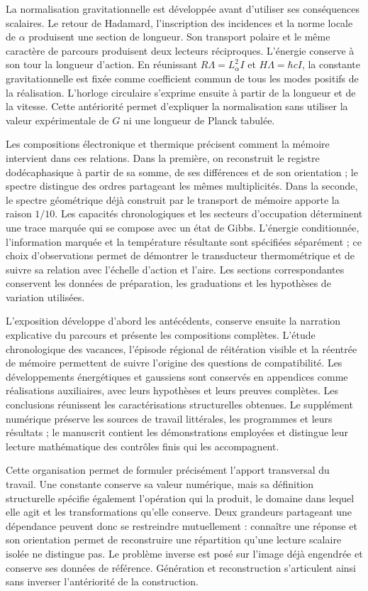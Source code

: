 La normalisation gravitationnelle est développée avant d'utiliser ses conséquences scalaires. Le retour de Hadamard, l'inscription des incidences et la norme locale de $\alpha$ produisent une section de longueur. Son transport polaire et le même caractère de parcours produisent deux lecteurs réciproques. L'énergie conserve à son tour la longueur d'action. En réunissant $R\Lambda=L_\alpha^2I$ et $H\Lambda=\hbar cI$, la constante gravitationnelle est fixée comme coefficient commun de tous les modes positifs de la réalisation. L'horloge circulaire s'exprime ensuite à partir de la longueur et de la vitesse. Cette antériorité permet d'expliquer la normalisation sans utiliser la valeur expérimentale de $G$ ni une longueur de Planck tabulée.

Les compositions électronique et thermique précisent comment la mémoire intervient dans ces relations. Dans la première, on reconstruit le registre dodécaphasique à partir de sa somme, de ses différences et de son orientation ; le spectre distingue des ordres partageant les mêmes multiplicités. Dans la seconde, le spectre géométrique déjà construit par le transport de mémoire apporte la raison $1/10$. Les capacités chronologiques et les secteurs d'occupation déterminent une trace marquée qui se compose avec un état de Gibbs. L'énergie conditionnée, l'information marquée et la température résultante sont spécifiées séparément ; ce choix d'observations permet de démontrer le transducteur thermométrique et de suivre sa relation avec l'échelle d'action et l'aire. Les sections correspondantes conservent les données de préparation, les graduations et les hypothèses de variation utilisées.

L'exposition développe d'abord les antécédents, conserve ensuite la narration explicative du parcours et présente les compositions complètes. L'étude chronologique des vacances, l'épisode régional de réitération visible et la réentrée de mémoire permettent de suivre l'origine des questions de compatibilité. Les développements énergétiques et gaussiens sont conservés en appendices comme réalisations auxiliaires, avec leurs hypothèses et leurs preuves complètes. Les conclusions réunissent les caractérisations structurelles obtenues. Le supplément numérique préserve les sources de travail littérales, les programmes et leurs résultats ; le manuscrit contient les démonstrations employées et distingue leur lecture mathématique des contrôles finis qui les accompagnent.

Cette organisation permet de formuler précisément l'apport transversal du travail. Une constante conserve sa valeur numérique, mais sa définition structurelle spécifie également l'opération qui la produit, le domaine dans lequel elle agit et les transformations qu'elle conserve. Deux grandeurs partageant une dépendance peuvent donc se restreindre mutuellement : connaître une réponse et son orientation permet de reconstruire une répartition qu'une lecture scalaire isolée ne distingue pas. Le problème inverse est posé sur l'image déjà engendrée et conserve ses données de référence. Génération et reconstruction s'articulent ainsi sans inverser l'antériorité de la construction.

